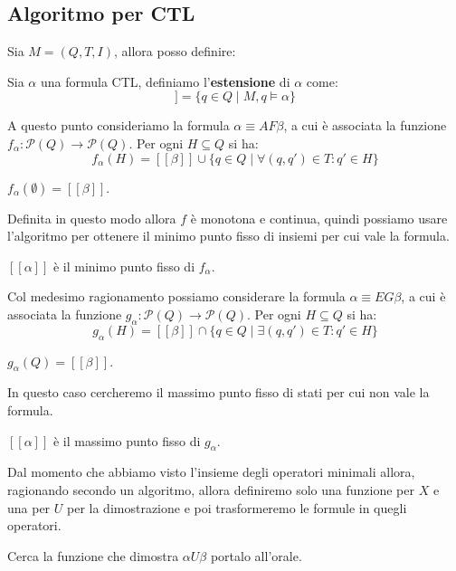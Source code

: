 \subsection{Algoritmo per CTL}
Sia $M=(Q,T,I)$, allora posso definire:
\begin{definizione}
    Sia $\alpha$ una formula CTL, definiamo l'\textbf{estensione} di $\alpha$ come:
    \begin{equation}
        [[\alpha]] = \{q \in Q \mid M, q \models \alpha\}
    \end{equation}
\end{definizione}
A questo punto consideriamo la formula $\alpha \equiv A F \beta$, a cui è associata
la funzione $f_\alpha: \mathcal{P}(Q) \to \mathcal{P}(Q)$. Per ogni $H \subseteq Q$
si ha:
\begin{equation}
    f_\alpha(H) = [[\beta]] \cup \{q \in Q \mid \forall(q, q') \in T: q ' \in H\}
\end{equation}
\begin{osservazione}
    $f_\alpha (\emptyset) = [[\beta]]$.
\end{osservazione}
Definita in questo modo allora $f$ è monotona e continua, quindi possiamo usare
l'algoritmo per ottenere il minimo punto fisso di insiemi per cui vale la formula.
\begin{center}
    $[[\alpha]]$ è il minimo punto fisso di $f_\alpha$.
\end{center}

Col medesimo ragionamento possiamo considerare la formula  $\alpha \equiv E G
    \beta$, a cui è associata la funzione $g_\alpha: \mathcal{P}(Q) \to \mathcal{P}(Q)$.
Per ogni $H \subseteq Q$ si ha:
\begin{equation}
    g_\alpha(H) = [[\beta]] \cap \{q \in Q \mid \exists(q, q') \in T: q ' \in H\}
\end{equation}
\begin{osservazione}
    $g_\alpha (Q) = [[\beta]]$.
\end{osservazione}
In questo caso cercheremo il massimo punto fisso di stati per cui non vale la
formula.
\begin{center}
    $[[\alpha]]$ è il massimo punto fisso di $g_\alpha$.
\end{center}
Dal momento che abbiamo visto l'insieme degli operatori minimali allora,
ragionando secondo un algoritmo, allora definiremo solo una funzione per $X$ e
una per $U$ per la dimostrazione e poi trasformeremo le formule in quegli operatori.
\begin{nota}
    Cerca la funzione che dimostra $\alpha U \beta$ portalo all'orale.
\end{nota}